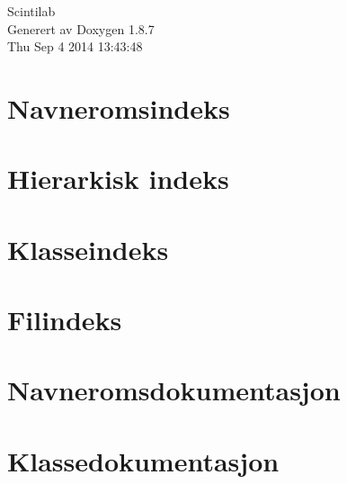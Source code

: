 \documentclass[twoside]{book}
\newcommand{\+}{\discretionary{\mbox{\scriptsize$\hookleftarrow$}}{}{}}
\newcommand{\clearemptydoublepage}{%
  \newpage{\pagestyle{empty}\cleardoublepage}%
}
\begin{document}
\hypersetup{pageanchor=false,
             bookmarks=true,
             bookmarksnumbered=true,
             pdfencoding=unicode
            }
\begin{titlepage}
\vspace*{7cm}
\begin{center}%
{\Large Scintilab }\\
\vspace*{1cm}
{\large Generert av Doxygen 1.8.7}\\
\vspace*{0.5cm}
{\small Thu Sep 4 2014 13:43:48}\\
\end{center}
\end{titlepage}
\clearemptydoublepage
\tableofcontents
\clearemptydoublepage
{}
\hypersetup{pageanchor=true}

\chapter{Navneromsindeks}

\chapter{Hierarkisk indeks}

\chapter{Klasseindeks}

\chapter{Filindeks}

\chapter{Navneromsdokumentasjon}

\chapter{Klassedokumentasjon}




















\end{document}
